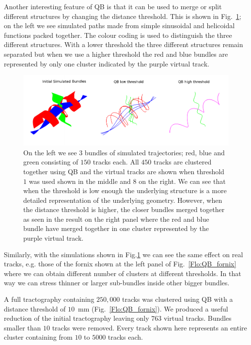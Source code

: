 \documentclass[journal]{IEEEtran}
\begin{document}
Another interesting feature of QB is that it can be used to merge or
split different structures by changing the distance threshold.  This is
shown in Fig.~\ref{Flo:simulated_orbits}; on the left we see simulated
paths made from simple sinusoidal and helicoidal functions packed
together. The colour coding is used to distinguish the three different
structures. With a lower threshold the three different structures remain
separated but when we use a higher threshold the red and blue bundles
are represented by only one cluster indicated by the purple virtual
track.

\begin{figure}
\begin{centering}
\includegraphics[scale=0.5]{Fig_5_helix_phantom}
\par\end{centering}
\caption{On the left we see $3$ bundles of simulated trajectories; red,
  blue and green consisting of $150$ tracks each. All $450$ tracks are
  clustered together using QB and the virtual tracks are shown when
  threshold $1$ was used shown in the middle and $8$ on the right.  We
  can see that when the threshold is low enough the underlying structure
  is a more detailed representation of the underlying geometry. However,
  when the distance threshold is higher, the closer bundles merged
  together as seen in the result on the right panel where the red and
  blue bundle have merged together in one cluster represented by the
  purple virtual track.\label{Flo:simulated_orbits}}
\end{figure}

Similarly, with the simulations shown in Fig.\ref{Flo:simulated_orbits}
we can see the same effect on real tracks, e.g. those of the fornix
shown at the left panel of Fig.~\ref{Flo:QB_fornix} where we can obtain
different number of clusters at different thresholds. In that way we can
stress thinner or larger sub-bundles inside other bigger bundles. 

A full tractography containing $250,000$ tracks was clustered using QB
with a distance threshold of $10$~mm (Fig.~\ref{Flo:QB_fornix}).  We
produced a useful reduction of the initial tractography leaving only
$763$ virtual tracks. Bundles smaller than $10$ tracks were
removed. Every track shown here represents an entire cluster containing
from $10$ to $5000$ tracks each.
\end{document}
